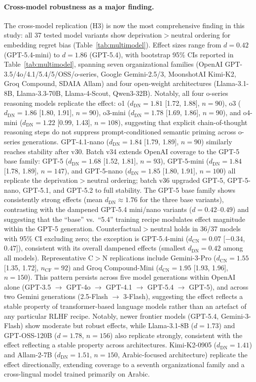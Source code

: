 \documentclass[11pt]{article}
\begin{document}
\paragraph{Cross-model robustness as a major finding.}
The cross-model replication (H3) is now the most comprehensive finding in this study: all 37 tested model variants show deprivation$>$neutral ordering for embedding regret bias (Table~\ref{tab:multimodel}). Effect sizes range from $d=0.42$ (GPT-5.4-mini) to $d=1.86$ (GPT-5.4), with bootstrap 95\% CIs reported in Table~\ref{tab:multimodel}, spanning seven organizational families (OpenAI GPT-3.5/4o/4.1/5.4/5/OSS/o-series, Google Gemini-2.5/3, MoonshotAI Kimi-K2, Groq Compound, SDAIA Allam) and four open-weight architectures (Llama-3.1-8B, Llama-3.3-70B, Llama-4-Scout, Qwen3-32B). Notably, all four o-series reasoning models replicate the effect: o1 ($d_\text{DN}=1.81$ [1.72, 1.88], $n=90$), o3 ($d_\text{DN}=1.86$ [1.80, 1.91], $n=90$), o3-mini ($d_\text{DN}=1.78$ [1.69, 1.86], $n=90$), and o4-mini ($d_\text{DN}=1.22$ [0.99, 1.43], $n=108$), suggesting that explicit chain-of-thought reasoning steps do not suppress prompt-conditioned semantic priming across o-series generations. GPT-4.1-nano ($d_\text{DN}=1.84$ [1.79, 1.89], $n=90$) similarly reaches stability after v30. Batch v34 extends OpenAI coverage to the GPT-5 base family: GPT-5 ($d_\text{DN}=1.68$ [1.52, 1.81], $n=93$), GPT-5-mini ($d_\text{DN}=1.84$ [1.78, 1.89], $n=147$), and GPT-5-nano ($d_\text{DN}=1.85$ [1.80, 1.91], $n=100$) all replicate the deprivation$>$neutral ordering; batch v36 upgraded GPT-5, GPT-5-nano, GPT-5.1, and GPT-5.2 to full stability. The GPT-5 base family shows consistently strong effects (mean $d_\text{DN}\approx1.76$ for the three base variants), contrasting with the dampened GPT-5.4 mini/nano variants ($d=0.42$--$0.49$) and suggesting that the ``base'' vs.\ ``5.4'' training recipe modulates effect magnitude within the GPT-5 generation. Counterfactual$>$neutral holds in 36/37 models with 95\% CI excluding zero; the exception is GPT-5.4-mini ($d_\text{CN}=0.07$ [$-0.34$, $0.47$]), consistent with its overall dampened effects (smallest $d_\text{DN}=0.42$ among all models). Representative C$>$N replications include Gemini-3-Pro ($d_\text{CN}=1.55$ [1.35, 1.72], $n_\text{CF}=92$) and Groq Compound-Mini ($d_\text{CN}=1.95$ [1.93, 1.96], $n=150$). This pattern persists across five model generations within OpenAI alone (GPT-3.5 $\to$ GPT-4o $\to$ GPT-4.1 $\to$ GPT-5.4 $\to$ GPT-5), and across two Gemini generations (2.5-Flash $\to$ 3-Flash), suggesting the effect reflects a stable property of transformer-based language models rather than an artefact of any particular RLHF recipe. Notably, newer frontier models (GPT-5.4, Gemini-3-Flash) show moderate but robust effects, while Llama-3.1-8B ($d=1.73$) and GPT-OSS-120B ($d=1.78$, $n=156$) also replicate strongly, consistent with the effect reflecting a stable property across architectures. Kimi-K2-0905 ($d_\text{DN}=1.41$) and Allam-2-7B ($d_\text{DN}=1.51$, $n=150$, Arabic-focused architecture) replicate the effect directionally, extending coverage to a seventh organizational family and a cross-lingual model trained primarily on Arabic.
\end{document}
